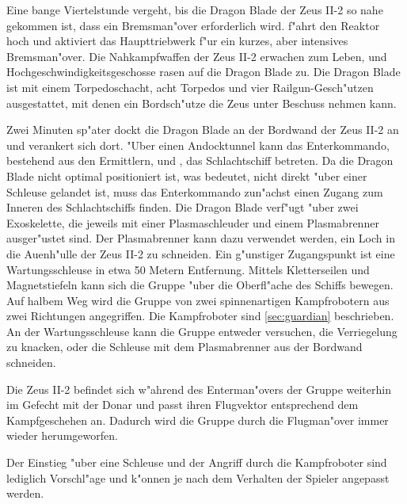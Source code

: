 Eine bange Viertelstunde vergeht, bis die Dragon Blade der Zeus II-2 so nahe gekommen ist, dass ein Bremsman"over erforderlich wird. \xl{} f"ahrt den Reaktor hoch und aktiviert das Haupttriebwerk f"ur ein kurzes, aber intensives Bremsman"over. Die Nahkampfwaffen der Zeus II-2 erwachen zum Leben, und Hochgeschwindigkeitsgeschosse rasen auf die Dragon Blade zu. Die Dragon Blade ist mit einem Torpedoschacht, acht Torpedos und vier Railgun-Gesch"utzen ausgestattet, mit denen ein Bordsch"utze die Zeus unter Beschuss nehmen kann.

Zwei Minuten sp"ater dockt die Dragon Blade an der Bordwand der Zeus II-2 an und verankert sich dort. "Uber einen Andocktunnel kann das Enterkommando, bestehend aus den Ermittlern, \xl{} und \ml{}, das Schlachtschiff betreten. Da die Dragon Blade nicht optimal positioniert ist, was bedeutet, nicht direkt "uber einer Schleuse gelandet ist, muss das Enterkommando zun"achst einen Zugang zum Inneren des Schlachtschiffs finden. Die Dragon Blade verf"ugt "uber zwei Exoskelette, die jeweils mit einer Plasmaschleuder und einem Plasmabrenner ausger"ustet sind. Der Plasmabrenner kann dazu verwendet werden, ein Loch in die Au\3enh"ulle der Zeus II-2 zu schneiden. Ein g"unstiger Zugangspunkt ist eine Wartungsschleuse in etwa 50 Metern Entfernung. Mittels Kletterseilen und Magnetstiefeln kann sich die Gruppe "uber die Oberfl"ache des Schiffs bewegen. Auf halbem Weg wird die Gruppe von zwei spinnenartigen Kampfrobotern aus zwei Richtungen angegriffen. Die Kampfroboter sind \cref{sec:guardian} beschrieben. An der Wartungsschleuse kann die Gruppe entweder versuchen, die Verriegelung zu knacken, oder die Schleuse mit dem Plasmabrenner aus der Bordwand schneiden.

\begin{remarks}
	Die Zeus II-2 befindet sich w"ahrend des Enterman"overs der Gruppe weiterhin im Gefecht mit der Donar und passt ihren Flugvektor entsprechend dem Kampfgeschehen an. Dadurch wird die Gruppe durch die Flugman"over immer wieder herumgeworfen.

	Der Einstieg "uber eine Schleuse und der Angriff durch die Kampfroboter sind lediglich Vorschl"age und k"onnen je nach dem Verhalten der Spieler angepasst werden.
\end{remarks}

